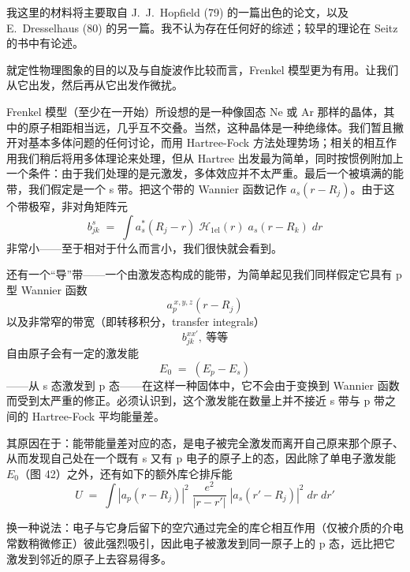 我这里的材料将主要取自 J.~J.~Hopfield (79) 的一篇出色的论文，以及 E.~Dresselhaus (80) 的另一篇。我不认为存在任何好的综述；较早的理论在 Seitz 的书中有论述。

就定性物理图象的目的以及与自旋波作比较而言，Frenkel 模型更为有用。让我们从它出发，然后再从它出发作微扰。

Frenkel 模型（至少在一开始）所设想的是一种像固态 Ne 或 Ar 那样的晶体，其中的原子相距相当远，几乎互不交叠。当然，这种晶体是一种绝缘体。我们暂且撇开对基本多体问题的任何讨论，而用 Hartree-Fock 方法处理势场；相关的相互作用我们稍后将用多体理论来处理，但从 Hartree 出发最为简单，同时按惯例附加上一个条件：由于我们处理的是元激发，多体效应并不太严重。最后一个被填满的能带，我们假定是一个 s 带。把这个带的 Wannier 函数记作 $a_s(r-R_j)$。由于这个带极窄，非对角矩阵元
\begin{equation*}
b_{jk}^{s} \;=\; \int a_s^{*}(R_j - r)\; \mathcal{H}_{1\mathrm{el}}(r)\; a_s(r - R_k)\; dr
\end{equation*}
非常小——至于相对于什么而言小，我们很快就会看到。

还有一个“导”带——一个由激发态构成的能带，为简单起见我们同样假定它具有 p 型 Wannier 函数
\begin{equation*}
a_p^{\,x,y,z}(r - R_j)
\end{equation*}
以及非常窄的带宽（即转移积分，transfer integrals）
\begin{equation*}
b_{jk}^{xx'},\ \text{等等}
\end{equation*}
自由原子会有一定的激发能
\begin{equation*}
E_0 \;=\; (E_p - E_s)
\end{equation*}
——从 s 态激发到 p 态——在这样一种固体中，它不会由于变换到 Wannier 函数而受到太严重的修正。必须认识到，这个激发能在数量上并不接近 s 带与 p 带之间的 Hartree-Fock 平均能量差。

其原因在于：能带能量差对应的态，是电子被完全激发而离开自己原来那个原子、从而发现自己处在一个既有 s 又有 p 电子的原子上的态，因此除了单电子激发能 $E_0$（图 42）之外，还有如下的额外库仑排斥能
\begin{equation*}
U \;=\; \int |a_p(r-R_j)|^2\; \frac{e^2}{|r-r'|}\; |a_s(r'-R_j)|^2\; dr\; dr'
\end{equation*}


换一种说法：电子与它身后留下的空穴通过完全的库仑相互作用（仅被介质的介电常数稍微修正）彼此强烈吸引，因此电子被激发到同一原子上的 p 态，远比把它激发到邻近的原子上去容易得多。

